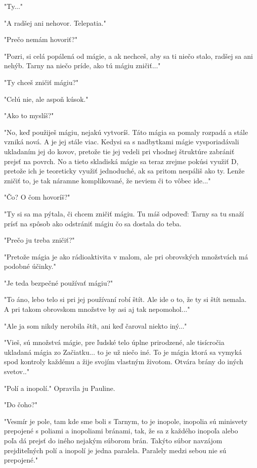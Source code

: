 \documentclass{book}
\begin{document}
"$ $Ty..."$ $ 

"$ $A radšej ani nehovor. Telepatia."$ $ 

"$ $Prečo nemám hovoriť?"$ $ 

"$ $Pozri, si celá popálená od mágie, a ak nechceš, aby sa ti niečo stalo, radšej sa ani nehýb. Tarny na niečo príde, ako tú mágiu zničiť..."$ $ 

"$ $Ty chceš zničiť mágiu?"$ $ 

"$ $Celú nie, ale aspoň kúsok."$ $ 

"$ $Ako to myslíš?"$ $ 

"$ $No, keď použiješ mágiu, nejakú vytvoríš. Táto mágia sa pomaly rozpadá a stále vzniká nová. A je jej stále viac. Kedysi sa s nadbytkami mágie vysporiadávali ukladaním jej do kovov, pretože tie jej vedeli pri vhodnej štruktúre zabrániť prejsť na povrch. No a tieto skladiská mágie sa teraz zrejme pokúsi využiť D, pretože ich je teoreticky využiť jednoduché, ak sa pritom nespáliš ako ty. Lenže zničiť to, je tak náramne komplikované, že neviem či to vôbec ide..."$ $ 

"$ $Čo? O čom hovoríš?"$ $ 

"$ $Ty si sa ma pýtala, či chcem zničiť mágiu. Tu máš odpoveď: Tarny sa tu snaží prísť na spôsob ako odstrániť mágiu čo sa dostala do teba.

"$ $Prečo ju treba zničiť?"$ $ 

"$ $Pretože mágia je ako rádioaktivita v malom, ale pri obrovských množstvách má podobné účinky."$ $ 

"$ $Je teda bezpečné používať mágiu?"$ $ 

"$ $To áno, lebo telo si pri jej používaní robí štít. Ale ide o to, že ty si štít nemala. A pri takom obrovskom množstve by asi aj tak nepomohol..."$ $ 

"$ $Ale ja som nikdy nerobila štít, ani keď čaroval niekto iný..."$ $ 

"$ $Vieš, sú množstvá mágie, pre ľudské telo úplne prirodzené, ale tisícročia ukladaná mágia zo Začiatku... to je už niečo iné. To je mágia ktorá sa vymyká spod kontroly každému a žije svojím vlastným životom. Otvára brány do iných svetov.."$ $ 

"$ $Polí a inopolí."$ $  Opravila ju Pauline.

"$ $Do čoho?"$ $ 

"$ $Vesmír je pole, tam kde sme boli s Tarnym, to je inopole, inopolia sú minisvety prepojené s poliami a inopoliami bránami, tak, že sa z každého inopoľa alebo poľa dá prejsť do iného nejakým súborom brán. Takýto súbor navzájom prejditeľných polí a inopolí je jedna paralela. Paralely medzi sebou nie sú prepojené."$ $ 
\end{document}
